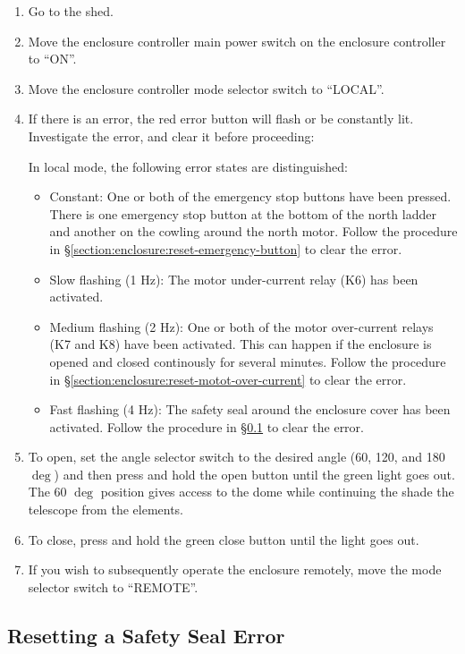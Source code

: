 \begin{enumerate}
\item
Go to the shed.
\item
Move the enclosure controller main power switch on the enclosure controller to “ON”.
\item
Move the enclosure controller mode selector switch to “LOCAL”.
\item
If there is an error, the red error button will flash or be constantly lit. Investigate the error, and clear it before proceeding:

In local mode, the following error states are distinguished:

\begin{itemize}
\item Constant: One or both of the emergency stop buttons have been pressed. There is one emergency stop button at the bottom of the north ladder and another on the cowling around the north motor. Follow the procedure in \S\ref{section:enclosure:reset-emergency-button} to clear the error.
\item Slow flashing (1 Hz): The motor under-current relay (K6) has been activated.
\item Medium flashing (2 Hz): One or both of the motor over-current relays (K7 and K8) have been activated. This can happen if the enclosure is opened and closed continously for several minutes. Follow the procedure in \S\ref{section:enclosure:reset-motot-over-current} to clear the error.
\item Fast flashing (4 Hz): The safety seal around the enclosure cover has been activated. Follow the procedure in \S\ref{section:enclosure:reset-safety-seal} to clear the error.
\end{itemize}

\item
To open, set the angle selector switch to the desired angle (60, 120, and 180 $\deg$) and then press and hold the open button until the green light goes out. The 60 $\deg$ position gives access to the dome while continuing the shade the telescope from the elements.
\item
To close, press and hold the green close button until the light goes out.
\item
If you wish to subsequently operate the enclosure remotely, move the mode selector switch to “REMOTE”.
\end{enumerate}

\subsection{Resetting a Safety Seal Error}
\label{section:enclosure:reset-safety-seal}

